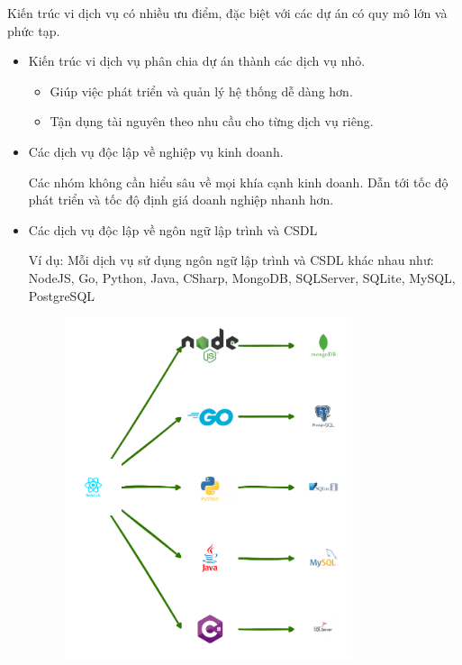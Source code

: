 Kiến trúc vi dịch vụ có nhiều ưu điểm, đặc biệt với các dự án có quy mô lớn và phức tạp.

\begin{itemize}

\item Kiến trúc vi dịch vụ phân chia dự án thành các dịch vụ nhỏ.

\begin{itemize}

\item Giúp việc phát triển và quản lý hệ thống dễ dàng hơn.

\item Tận dụng tài nguyên theo nhu cầu cho từng dịch vụ riêng.

\end{itemize}

\item Các dịch vụ độc lập về nghiệp vụ kinh doanh.

Các nhóm không cần hiểu sâu về mọi khía cạnh kinh doanh. Dẫn tới tốc độ phát triển và tốc độ định giá doanh nghiệp nhanh hơn.

\item Các dịch vụ độc lập về ngôn ngữ lập trình và CSDL

Ví dụ: Mỗi dịch vụ sử dụng ngôn ngữ lập trình và CSDL khác nhau như: NodeJS, Go, Python, Java, CSharp, MongoDB, SQLServer, SQLite, MySQL, PostgreSQL

\begin{figure}[H]

\centering

\includegraphics[height = 10cm]{pictures/DaNgonNguVaCSDL/main.drawio.png}


\end{figure}
\end{itemize}
